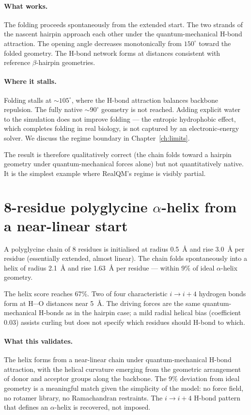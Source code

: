 \paragraph{What works.} The folding proceeds spontaneously from the extended start. The two strands of the nascent hairpin approach each other under the quantum-mechanical H-bond attraction. The opening angle decreases monotonically from $150^\circ$ toward the folded geometry. The H-bond network forms at distances consistent with reference $\beta$-hairpin geometries.

\paragraph{Where it stalls.} Folding stalls at $\sim 105^\circ$, where the H-bond attraction balances backbone repulsion. The fully native $\sim 90^\circ$ geometry is not reached. Adding explicit water to the simulation does not improve folding --- the entropic hydrophobic effect, which completes folding in real biology, is not captured by an electronic-energy solver. We discuss the regime boundary in Chapter~\ref{ch:limits}.

The result is therefore qualitatively correct (the chain folds toward a hairpin geometry under quantum-mechanical forces alone) but not quantitatively native. It is the simplest example where RealQM's regime is visibly partial.

\section{8-residue polyglycine $\alpha$-helix from a near-linear start}\label{sec:helix}

A polyglycine chain of 8 residues is initialised at radius 0.5~\AA{} and rise 3.0~\AA{} per residue (essentially extended, almost linear). The chain folds spontaneously into a helix of radius 2.1~\AA{} and rise 1.63~\AA{} per residue --- within 9\% of ideal $\alpha$-helix geometry.

The helix score reaches 67\%. Two of four characteristic $i \to i{+}4$ hydrogen bonds form at H$\cdots$O distances near 5~\AA. The driving forces are the same quantum-mechanical H-bonds as in the hairpin case; a mild radial helical bias (coefficient 0.03) assists curling but does not specify which residues should H-bond to which.

\paragraph{What this validates.} The helix forms from a near-linear chain under quantum-mechanical H-bond attraction, with the helical curvature emerging from the geometric arrangement of donor and acceptor groups along the backbone. The 9\% deviation from ideal geometry is a meaningful match given the simplicity of the model: no force field, no rotamer library, no Ramachandran restraints. The $i \to i{+}4$ H-bond pattern that defines an $\alpha$-helix is recovered, not imposed.

